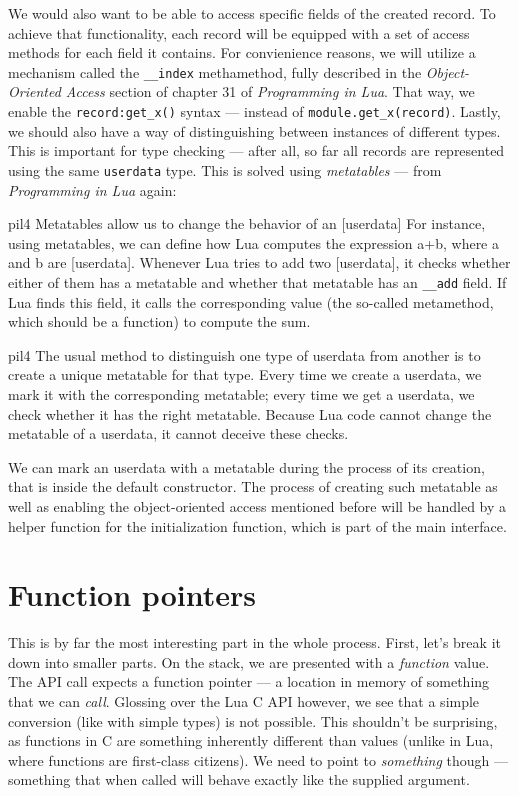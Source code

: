 \documentclass[polish, english]{iithesis}
\begin{document}
    We would also want to be able to access specific fields of the created record.
    To achieve that functionality, each record will be equipped with a set of access methods for each field it contains.
    For convienience reasons, we will utilize a mechanism called the \texttt{\_\_index} methamethod, fully described in the \textit{Object-Oriented Access} section of chapter 31 of \textit{Programming in Lua}.
    That way, we enable the \lstinline[language={[5.2]Lua}]|record:get_x()| syntax --- instead of \lstinline[language={[5.2]Lua}]|module.get_x(record)|.
    Lastly, we should also have a way of distinguishing between instances of different types.
    This is important for type checking --- after all, so far all records are represented using the same \texttt{userdata} type.
    This is solved using \textit{metatables} --- from \textit{Programming in Lua} again:
    \begin{displaycquote}{pil4}
      Metatables allow us to change the behavior of an [userdata] 
      For instance, using metatables, we can define how Lua computes the expression a+b, where a and b are [userdata]. 
      Whenever Lua tries to add two [userdata], it checks whether either of them has a metatable and whether that metatable has an \texttt{\_\_add} field. 
      If Lua finds this field, it calls the corresponding value (the so-called metamethod, which should be a function) to compute the sum.
    \end{displaycquote}
    \begin{displaycquote}{pil4}
      The usual method to distinguish one type of userdata from another is to create a unique metatable for that type.
      Every time we create a userdata, we mark it with the corresponding metatable; every time we get a userdata, we check whether it has the right metatable. 
      Because Lua code cannot change the metatable of a userdata, it cannot deceive these checks.
    \end{displaycquote}
    We can mark an userdata with a metatable during the process of its creation, that is inside the default constructor.
    The process of creating such metatable as well as enabling the object-oriented access mentioned before will be handled by a helper function for the initialization function, which is part of the main interface.

  \section{Function pointers}
    This is by far the most interesting part in the whole process.
    First, let's break it down into smaller parts.
    On the stack, we are presented with a \textit{function} value.
    The API call expects a function pointer --- a location in memory of something that we can \textit{call}.
    Glossing over the Lua C API however, we see that a simple conversion (like with simple types) is not possible.
    This shouldn't be surprising, as functions in C are something inherently different than values (unlike in Lua, where functions are first-class citizens).
    We need to point to \textit{something} though --- something that when called will behave exactly like the supplied argument.
\end{document}
